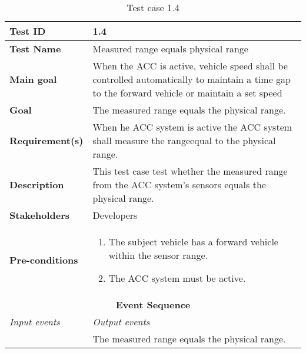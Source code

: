 \begin{table}[H]
\centering
\begin{tabularx}{\linewidth}{X|X}
  \hline
  \textbf{Test ID} & 1.4 \\
  \hline
  \textbf{Test Name} & Measured range equals physical range  \\
  \hline
  \textbf{Main goal} & When the ACC is active, vehicle speed shall be controlled automatically to maintain a time gap to the forward vehicle or maintain a set speed \\
  \hline
  \textbf{Goal} & The measured range equals the physical range.  \\
  \hline
  \textbf{Requirement(s)} &  When he ACC system is active the ACC system shall measure the rangeequal to the physical range. \\
  \hline
  \textbf{Description} & This test case test whether the measured range from the ACC system's sensors equals the physical range. \\
  \hline
  \textbf{Stakeholders} &  Developers \\
  \hline
  \textbf{Pre-conditions} &
  \begin{enumerate}
      \item The subject vehicle has a forward vehicle within the sensor range. 
      \item The ACC system must be active.
  \end{enumerate}
  \\
  \hline
  \multicolumn{2}{c}{\textbf{Event Sequence}} \\
  \hline
  \textit{Input events} & \textit{Output events} \\
  \hline
   & The measured range equals the physical range. \\
  \hline
  \end{tabularx}
\caption{\label{tab_case4} Test case 1.4}
\end{table}

